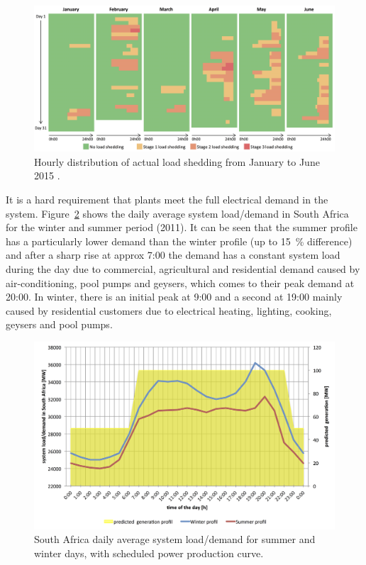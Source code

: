 \begin{figure}[htbp]  
\centering
\includegraphics[width=1\linewidth]{FIG/Load_shedding}
\caption[Hourly distribution of actual load shedding from January to June 2015.]{Hourly distribution of actual load shedding from January to June 2015 \cite{CSIREnergyCentre2015}.}\label{Load_shedding}
\end{figure}
It is a  hard requirement that plants meet the full electrical demand in the system. Figure~\ref{LoadScenarios} shows the daily average system load/demand in South Africa for the winter and summer period (2011). It can be seen that the summer profile has a particularly lower demand than the winter profile (up to \SI{15}{\percent} difference) and after a sharp rise at approx 7:00 the demand has a constant system load during the day due to commercial, agricultural and residential demand caused by air-conditioning, pool pumps and geysers, which comes to their peak demand at 20:00. In winter, there is an initial peak at 9:00 and a second at 19:00 mainly caused by residential customers due to electrical heating, lighting, cooking, geysers and pool pumps.

\begin{figure}[htbp]  
\centering
\includegraphics[width=1\linewidth]{FIG/LoadScenarios}
\caption[South Africa daily average system load/demand for summer and winter days, with scheduled power production curve.]{South Africa daily average system load/demand for summer and winter days, with scheduled power production curve.}\label{LoadScenarios}
\end{figure}

